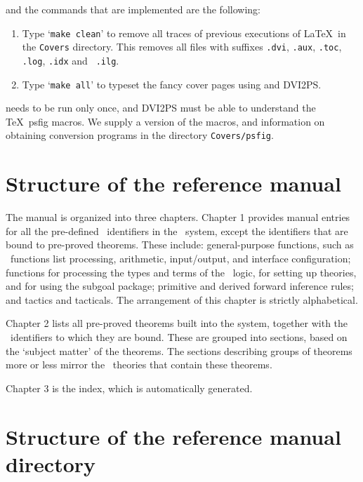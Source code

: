 \noindent and the commands that are implemented are the following:

\begin{enumerate}

\item Type `{\tt make clean}' to remove all traces of previous executions of
\LaTeX\ in the {\tt Covers} directory.  This removes all files with
suffixes {\tt .dvi}, {\tt .aux}, {\tt .toc}, {\tt .log}, {\tt .idx} and {\tt
.ilg}.

\item Type `{\tt make all}' to typeset the fancy cover pages using
\latex and {\small DVI2PS}.

\end{enumerate}

 needs to be run only once, and {\small DVI2PS} must
be able to understand the \TeX\ psfig macros.  We supply a version of
the macros, and information on obtaining conversion programs in the
directory {\tt Covers/psfig}.

\section{Structure of the reference manual}

The manual is organized into three chapters.  Chapter 1 provides manual entries
for all the pre-defined \ML\ identifiers in the \HOL\ system, except the
identifiers that are bound to pre-proved theorems. These include:
general-purpose functions, such as \ML\ functions list processing, arithmetic,
input/output, and interface configuration; functions for processing the types
and terms of the \HOL\ logic, for setting up theories, and for using the
subgoal package; primitive and derived forward inference rules; and tactics and
tacticals.  The arrangement of this chapter is strictly alphabetical.

Chapter 2 lists all pre-proved theorems built into the system, \mbox{together}
with the \ML\ identifiers to which they are bound. These are grouped into
sections, based on the `subject matter' of the theorems.  The sections
describing groups of theorems more or less mirror the \HOL\ theories that
contain these theorems.

Chapter 3 is the index, which is automatically generated.

\section{Structure of the reference manual directory}

